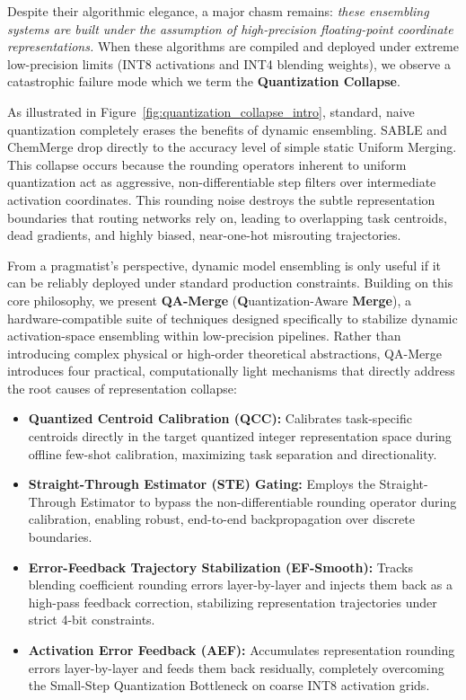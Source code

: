 Despite their algorithmic elegance, a major chasm remains: \emph{these ensembling systems are built under the assumption of high-precision floating-point coordinate representations.} When these algorithms are compiled and deployed under extreme low-precision limits (INT8 activations and INT4 blending weights), we observe a catastrophic failure mode which we term the \textbf{Quantization Collapse}. 

As illustrated in Figure~\ref{fig:quantization_collapse_intro}, standard, naive quantization completely erases the benefits of dynamic ensembling. SABLE and ChemMerge drop directly to the accuracy level of simple static Uniform Merging. This collapse occurs because the rounding operators inherent to uniform quantization act as aggressive, non-differentiable step filters over intermediate activation coordinates. This rounding noise destroys the subtle representation boundaries that routing networks rely on, leading to overlapping task centroids, dead gradients, and highly biased, near-one-hot misrouting trajectories.

From a pragmatist's perspective, dynamic model ensembling is only useful if it can be reliably deployed under standard production constraints. Building on this core philosophy, we present \textbf{QA-Merge} (\textbf{Q}uantization-Aware \textbf{Merge}), a hardware-compatible suite of techniques designed specifically to stabilize dynamic activation-space ensembling within low-precision pipelines. Rather than introducing complex physical or high-order theoretical abstractions, QA-Merge introduces four practical, computationally light mechanisms that directly address the root causes of representation collapse:

\begin{itemize}
    \item \textbf{Quantized Centroid Calibration (QCC):} Calibrates task-specific centroids directly in the target quantized integer representation space during offline few-shot calibration, maximizing task separation and directionality.
    \item \textbf{Straight-Through Estimator (STE) Gating:} Employs the Straight-Through Estimator \cite{bengio2013estimating} to bypass the non-differentiable rounding operator during calibration, enabling robust, end-to-end backpropagation over discrete boundaries.
    \item \textbf{Error-Feedback Trajectory Stabilization (EF-Smooth):} Tracks blending coefficient rounding errors layer-by-layer and injects them back as a high-pass feedback correction, stabilizing representation trajectories under strict 4-bit constraints.
    \item \textbf{Activation Error Feedback (AEF):} Accumulates representation rounding errors layer-by-layer and feeds them back residually, completely overcoming the Small-Step Quantization Bottleneck on coarse INT8 activation grids.
\end{itemize}

